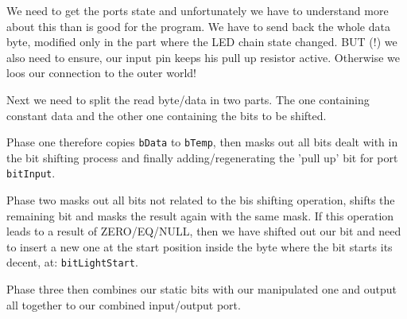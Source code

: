 We need to get the ports state and unfortunately we have to understand more about this than is good for the program. We have to send back the whole data byte, modified only in the part where the LED chain state changed. BUT (!) we also need to ensure, our input pin keeps his pull up resistor active. Otherwise we loos our connection to the outer world!

Next we need to split the read byte/data in two parts. The one containing constant data and the other one containing the bits to be shifted.

Phase one therefore copies \texttt{bData} to \texttt{bTemp}, then masks out all bits dealt with in the bit shifting process and finally adding/regenerating the 'pull up' bit for port \texttt{bitInput}.

Phase two masks out all bits not related to the bis shifting operation, shifts the remaining bit and masks the result again with the same mask. If this operation leads to a result of ZERO/EQ/NULL, then we have shifted out our bit and need to insert a new one at the start position inside the byte where the bit starts its decent, at: \texttt{bitLightStart}.

Phase three then combines our static bits with our manipulated one and output all together to our combined input/output port.
